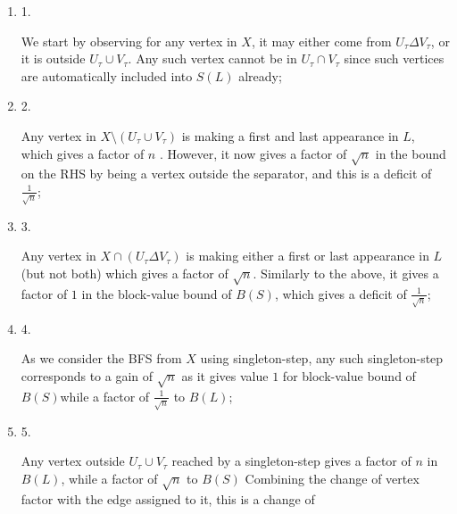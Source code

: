 \documentclass[10pt,a4paper]{article}
\begin{document}
\begin{enumerate}


\item[] 
1. 


We start by observing for any vertex in $X$, it may either come from $U_{\tau}\Delta V_{\tau}$, or it is outside $U_{\tau}\cup V_{\tau}$. Any such vertex cannot be in $U_{\tau}\cap V_{\tau}$ since such vertices are automatically included into $S(L)$ already;\par





\item[] 
2. 


Any vertex in $X\setminus(U_{\tau}\cup V_{\tau})$ is making a first and last appearance in $L$, which gives a factor of $n$ . However, it now gives a factor of $\sqrt{n}$ in the bound on the RHS by being a vertex outside the separator, and this is a deficit of $\frac{1}{\sqrt{n}}$;\par





\item[] 
3. 


Any vertex in $X\cap(U_{\tau}\Delta V_{\tau})$ is making either a first or last appearance in $L$ (but not both) which gives a factor of $\sqrt{n}$. Similarly to the above, it gives a factor of $1$ in the block-value bound of $B(S)$, which gives a deficit of $\frac{1}{\sqrt{n}}$;\par





\item[] 
4. 


As we consider the BFS from $X$ using singleton-step, any such singleton-step corresponds to a gain of $\sqrt{n}$ as it gives value $1$ for block-value bound of $B(S)$while a factor of $\frac{1}{\sqrt{n}}$ to $B(L)$;\par





\item[] 
5. 


Any vertex outside $U_{\tau}\cup V_{\tau}$ reached by a singleton-step gives a factor of $n$ in $B(L)$, while a factor of $\sqrt{n}$ to $B(S)$ Combining the change of vertex factor with the edge assigned to it, this is a change of\par



\end{enumerate}
\end{document}
